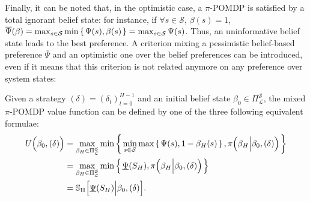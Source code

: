 Finally, it can be noted that, in the optimistic case, 
a $\pi$-POMDP is satisfied by a total ignorant belief state:
for instance, if $\forall s \in \mathcal{S}$, $\beta(s) = 1$,
$\overline{\Psi}(\beta) = \max_{s \in \mathcal{S}} \min \left\{ \left.  \Psi(s), \beta(s)  \right. \right\} = \max_{s \in \mathcal{S}} \Psi(s) $.
Thus, an uninformative belief state leads to the best preference.
A criterion mixing a pessimistic belief-based preference $\overline{\Psi}$
and an optimistic one over the belief preferences 
can be introduced, even if it means that 
this criterion is not related anymore on any preference 
over system states:

\begin{Def}
\label{def_optpesscrit}
Given a strategy $(\delta)=(\delta_t)_{t=0}^{H-1}$
and an initial belief state $\beta_0 \in \Pi_{\mathcal{L}}^{\mathcal{S}}$,
the mixed $\pi$-POMDP value function can be defined by one of the three following equivalent formulae:
\begin{align}
U \Big( \beta_0, (\delta)  \Big) &= \max_{\beta_H \in \Pi^{\mathcal{S}}_{\mathcal{L}}} \min \left\{ \left.  \min_{s \in \mathcal{S}} \max \left\{ \left.  \Psi(s), 1 - \beta_H(s)  \right. \right\}, \pi \Big( \beta_H \Big\vert \beta_0, (\delta) \Big)  \right. \right\}\\ 
&= \max_{\beta_H \in \Pi^{\mathcal{S}}_{\mathcal{L}}} \min \left\{ \left. \underline{\Psi}(S_H), \pi \Big( \beta_H \Big\vert \beta_0, (\delta) \Big)  \right. \right\} \nonumber \\ 
&= \mathbb{S}_{\Pi} \Big[ \underline{\Psi}(S_H) \Big\vert \beta_0, (\delta) \Big] \nonumber.
\end{align}
\end{Def}

